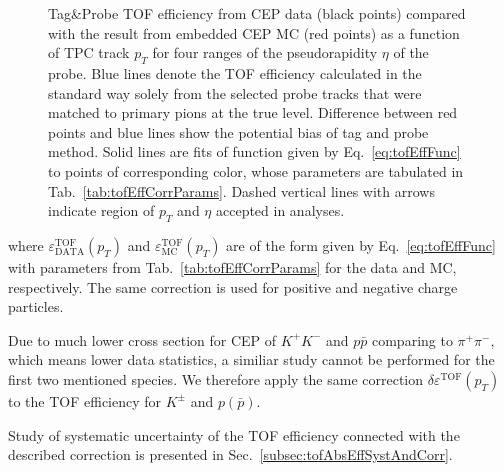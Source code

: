 \begin{figure}[H]
{\begin{subfigure}[b]{\linewidth}
  \end{subfigure}
}%
\caption[Tag\&Probe TOF efficiency from CEP data compared with the result from embedded CEP MC (divided w.r.t. $\eta$ of the probe).]%
    {Tag\&Probe TOF efficiency from CEP data (black points) compared with the result from embedded CEP MC (red points) as a function of TPC track $p_{T}$ for four ranges of the pseudorapidity $\eta$ of the probe. Blue lines denote the TOF efficiency calculated in the standard way solely from the selected probe tracks that were matched to primary pions at the true level. Difference between red points and blue lines show the potential bias of tag and probe method. Solid lines are fits of function given by Eq.~\eqref{eq:tofEffFunc} to points of corresponding color, whose parameters are tabulated in Tab.~\ref{tab:tofEffCorrParams}. Dashed vertical lines with arrows indicate region of $p_{T}$ and $\eta$ accepted in analyses.}\label{fig:tofEffSyst_etaBins}%
\end{figure}%
%
%
%
%
\noindent where $\varepsilon^{\text{TOF}}_{\text{DATA}}(p_{T})$ and $\varepsilon^{\text{TOF}}_{\text{MC}}(p_{T})$ are of the form given by Eq.~\eqref{eq:tofEffFunc} with parameters from Tab.~\ref{tab:tofEffCorrParams} for the data and MC, respectively. The same correction is used for positive and negative charge particles.

Due to much lower cross section for CEP of $K^{+}K^{-}$ and $p\bar{p}$ comparing to $\pi^{+}\pi^{-}$, which means lower data statistics, a similiar study cannot be performed for the first two mentioned species. We therefore apply the same correction $\delta\varepsilon^{\text{TOF}}(p_{T})$ to the TOF efficiency for $K^{\pm}$ and $p(\bar{p})$.

Study of systematic uncertainty of the TOF efficiency connected with the described correction is presented in Sec.~\ref{subsec:tofAbsEffSystAndCorr}.
 

